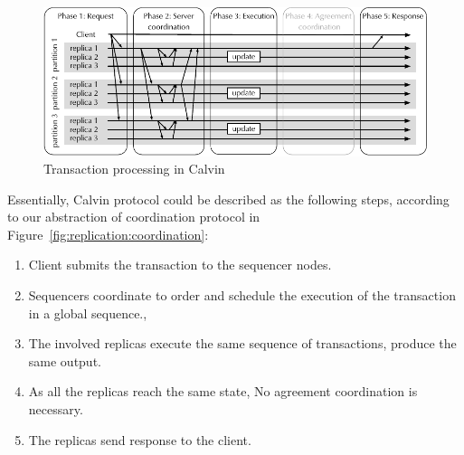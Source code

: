 \begin{figure}
  \begin{minipage}[b]{1.0\linewidth}
  \centering
        \includegraphics[width=1\linewidth]{figures/calvin}
  \end{minipage}
  \caption{Transaction processing in Calvin}
  \label{fig:calvin}
\end{figure}

Essentially, Calvin protocol could be described as the following steps, according to
our abstraction of coordination protocol in
Figure~\ref{fig:replication:coordination}:

\begin{enumerate}
  \item Client submits the transaction to the sequencer nodes.
  \item Sequencers coordinate to order and schedule the execution of the transaction in a global sequence.,
  \item The involved replicas execute the same sequence of transactions, produce the same output.
  \item As all the replicas reach the same state, No agreement coordination is necessary.
  \item The replicas send response to the client.
\end{enumerate}



